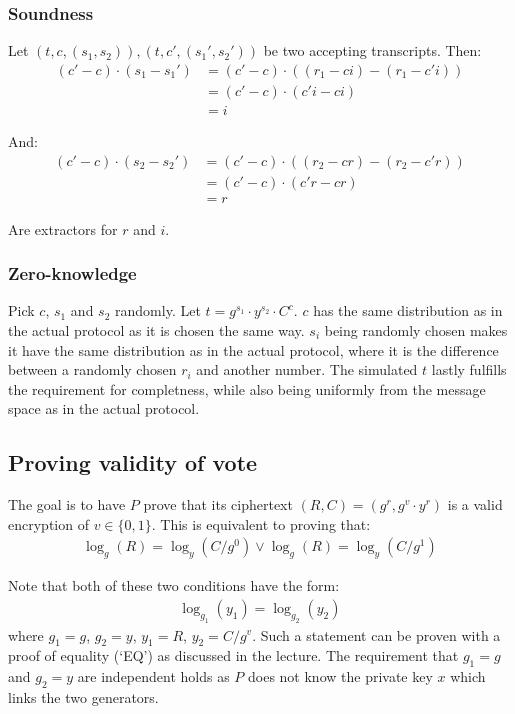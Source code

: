 \documentclass[a4paper]{scrreprt}
\begin{document}
\subsubsection{Soundness}

Let $(t, c, (s_1, s_2)), (t, c', (s_1', s_2'))$ be two accepting transcripts.
Then:
\begin{align*}
  (c' - c) \cdot (s_1 - s_1') & = (c' - c) \cdot ((r_1 - ci) - (r_1 - c' i)) \\
                              & = (c' - c) \cdot (c' i - ci) \\
                              & = i
\end{align*}

And:
\begin{align*}
  (c' - c) \cdot (s_2 - s_2') & = (c' - c) \cdot ((r_2 - cr) - (r_2 - c' r)) \\
                              & = (c' - c) \cdot (c' r - cr) \\
                              & = r
\end{align*}

Are extractors for $r$ and $i$.

\subsubsection{Zero-knowledge}

Pick $c$, $s_1$ and $s_2$ randomly. Let $t = g^{s_1} \cdot y^{s_2} \cdot C^c$.
$c$ has the same distribution as in the actual protocol as it is chosen the
same way. $s_i$ being randomly chosen makes it have the same distribution as in
the actual protocol, where it is the difference between a randomly chosen $r_i$
and another number. The simulated $t$ lastly fulfills the requirement for
completness, while also being uniformly from the message space as in the actual
protocol.

\subsection{Proving validity of vote}

The goal is to have $P$ prove that its ciphertext $(R, C) = (g^r, g^v \cdot
y^r)$ is a valid encryption of $v \in \{0, 1\}$. This is equivalent to proving
that:
\begin{align*}
		\log_{g}(R) = \log_{y}(C / g^0) \lor \log_{g}(R) = \log_{y}(C / g^1)
\end{align*}

Note that both of these two conditions have the form:
\begin{align*}
		\log_{g_1}(y_1) = \log_{g_2}(y_2)
\end{align*}
where $g_1 = g$, $g_2 = y$, $y_1 = R$, $y_2 = C / g^v$. Such a statement can be
proven with a proof of equality (`EQ') as discussed in the lecture. The
requirement that $g_1 = g$ and $g_2 = y$ are independent holds as $P$ does not
know the private key $x$ which links the two generators.
\end{document}
